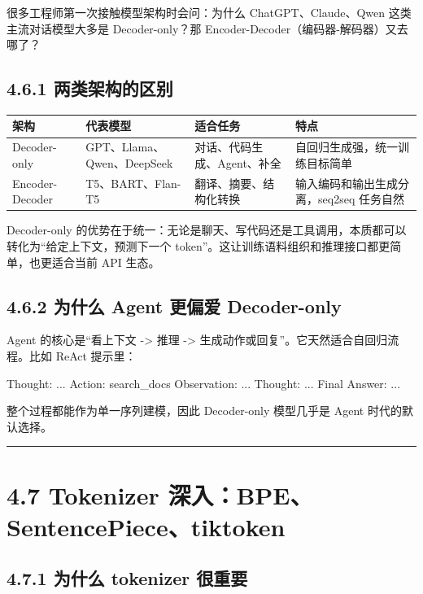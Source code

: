 很多工程师第一次接触模型架构时会问：为什么 ChatGPT、Claude、Qwen 这类主流对话模型大多是 Decoder-only？那 Encoder-Decoder（编码器-解码器）又去哪了？


\subsection{4.6.1 两类架构的区别}

\begingroup
\scriptsize
\setlength{\tabcolsep}{3pt}
\begin{longtable}{|p{}|p{}|p{}|p{}|}
\hline
架构 & 代表模型 & 适合任务 & 特点 \\ \hline
Decoder-only & GPT、Llama、Qwen、DeepSeek & 对话、代码生成、Agent、补全 & 自回归生成强，统一训练目标简单 \\ \hline
Encoder-Decoder & T5、BART、Flan-T5 & 翻译、摘要、结构化转换 & 输入编码和输出生成分离，seq2seq 任务自然 \\ \hline
\end{longtable}
\endgroup

Decoder-only 的优势在于统一：无论是聊天、写代码还是工具调用，本质都可以转化为``给定上下文，预测下一个 token''。这让训练语料组织和推理接口都更简单，也更适合当前 API 生态。


\subsection{4.6.2 为什么 Agent 更偏爱 Decoder-only}

Agent 的核心是``看上下文 -> 推理 -> 生成动作或回复''。它天然适合自回归流程。比如 ReAct 提示里：


\begin{codeblock}
Thought: ...
Action: search_docs
Observation: ...
Thought: ...
Final Answer: ...
\end{codeblock}

整个过程都能作为单一序列建模，因此 Decoder-only 模型几乎是 Agent 时代的默认选择。


\bigskip\hrule\bigskip

\section{4.7 Tokenizer 深入：BPE、SentencePiece、tiktoken}

\subsection{4.7.1 为什么 tokenizer 很重要}

